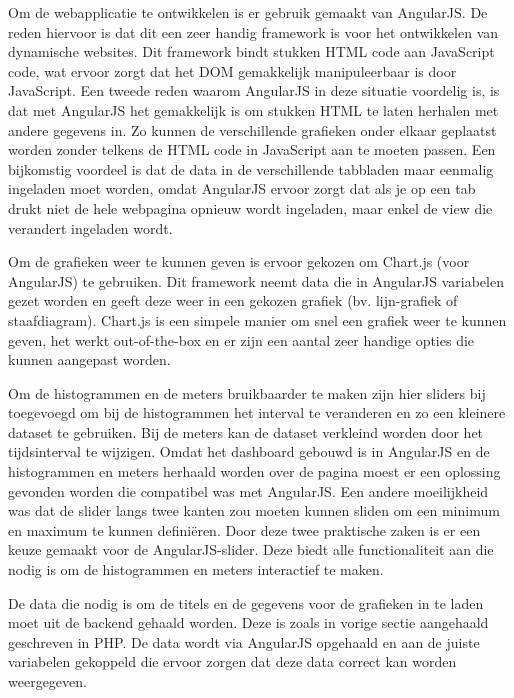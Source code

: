 Om de webapplicatie te ontwikkelen is er gebruik gemaakt van AngularJS. De reden hiervoor is dat dit een zeer handig framework is voor het ontwikkelen van dynamische websites. Dit framework bindt stukken HTML code aan JavaScript code, wat ervoor zorgt dat het DOM gemakkelijk manipuleerbaar is door JavaScript. Een tweede reden waarom AngularJS in deze situatie voordelig is, is dat met AngularJS het gemakkelijk is om stukken HTML te laten herhalen met andere gegevens in. Zo kunnen de verschillende grafieken onder elkaar geplaatst worden zonder telkens de HTML code in JavaScript aan te moeten passen. Een bijkomstig voordeel is dat de data in de verschillende tabbladen maar eenmalig ingeladen moet worden, omdat AngularJS ervoor zorgt dat als je op een tab drukt niet de hele webpagina opnieuw wordt ingeladen, maar enkel de view die verandert ingeladen wordt.

Om de grafieken weer te kunnen geven is ervoor gekozen om Chart.js (voor AngularJS) te gebruiken. Dit framework neemt data die in AngularJS variabelen gezet worden en geeft deze weer in een gekozen grafiek (bv. lijn-grafiek of staafdiagram). Chart.js is een simpele manier om snel een grafiek weer te kunnen geven, het werkt out-of-the-box en er zijn een aantal zeer handige opties die kunnen aangepast worden. 

Om de histogrammen en de meters bruikbaarder te maken zijn hier sliders bij toegevoegd om bij de histogrammen het interval te veranderen en zo een kleinere dataset te gebruiken. Bij de meters kan de dataset verkleind worden door het tijdsinterval te wijzigen. Omdat het dashboard gebouwd is in AngularJS en de histogrammen en meters herhaald worden over de pagina moest er een oplossing gevonden worden die compatibel was met AngularJS. Een andere moeilijkheid was dat de slider langs twee kanten zou moeten kunnen sliden om een minimum en maximum te kunnen defini\"eren. Door deze twee praktische zaken is er een keuze gemaakt voor de AngularJS-slider. Deze biedt alle functionaliteit aan die nodig is om de histogrammen en meters interactief te maken.


De data die nodig is om de titels en de gegevens voor de grafieken in te laden moet uit de backend gehaald worden. Deze is zoals in vorige sectie aangehaald geschreven in PHP. De data wordt via AngularJS opgehaald en aan de juiste variabelen gekoppeld die ervoor zorgen dat deze data correct kan worden weergegeven.\\ 

